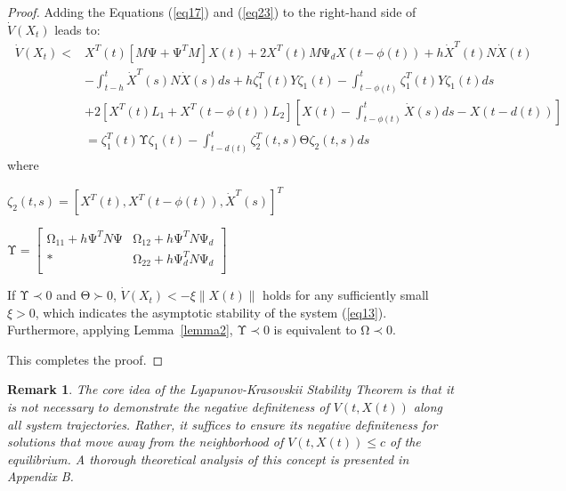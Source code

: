 \documentclass[a4paper]{cas-sc}
\newtheorem*{proof}{Proof}
\newtheorem{remark}[theorem]{Remark}
\begin{document}
\begin{proof}
Adding the Equations (\ref{eq17}) and (\ref{eq23}) to the right-hand side of $\dot{V}\left(X_t\right)$ leads to:
\begin{equation}
  \begin{aligned}
\ \dot{V}\left(X_t\right)<&X^T(t)\left[M\mathrm{\Psi}+\mathrm{\Psi}^TM\right]X(t)+2X^T(t)M\mathrm{\Psi}_dX(t-\phi(t))+h{\dot{X}}^T\left(t\right)N\dot{X}\left(t\right)\\
&-\int_{t-h}^{t}{\dot{X}}^T\left(s\right)N\dot{X}\left(s\right)ds+h\zeta_1^T(t)Y\zeta_1(t)-\int_{t-\phi(t)}^{t}\zeta_1^T(t)Y\zeta_1(t)ds\\
&+2\left[X^T(t)L_1+X^T(t-\phi(t))L_2\right]\left[X(t)-\int_{t-\phi(t)}^{t}\dot{X}(s)ds-X(t-d(t))\right]\\
&=\zeta_1^T(t)\mathrm{\Upsilon}\zeta_1(t)-\int_{t-d(t)}^{t}\zeta_2^T(t,s)\mathrm{\Theta}\zeta_2(t,s)ds 
  \end{aligned}
    \label{eq24}
\end{equation}
where 
\begin{description}
\item $\zeta_2\left(t,s\right)=\left[X^T\left(t\right),X^T\left(t-\phi\left(t\right)\right),{\dot{X}}^T(s)\right]^T$
\item $\mathrm{\Upsilon}=\left[\begin{matrix}\mathrm{\Omega}_{11}+h\mathrm{\Psi}^TN\mathrm{\Psi}&\mathrm{\Omega}_{12}+h\mathrm{\Psi}^TN\mathrm{\Psi}_d\\\ast&\mathrm{\Omega}_{22}+h\mathrm{\Psi}_d^TN\mathrm{\Psi}_d\\\end{matrix}\right]$
\end{description}

If $\mathrm{\Upsilon}\prec0$ and $\mathrm{\Theta}\succ0$, $\dot{V}\left(X_t\right)<-\xi\left\| {{{X}}(t)} \right\|$ holds for any sufficiently small $\xi>0$, which indicates the asymptotic stability of the system (\ref{eq13}). Furthermore, applying Lemma~\ref{lemma2}, $\mathrm{\Upsilon}\prec0$ is equivalent to $\mathrm{\Omega}\prec0$.

This completes the proof. 
\end{proof}

\begin{remark}
  \label{remarkdiff}
  The core idea of the Lyapunov-Krasovskii Stability Theorem is that it is not necessary to demonstrate the negative definiteness of $V\left(t,X\left(t\right)\right)$ along all system trajectories. Rather, it suffices to ensure its negative definiteness for solutions that move away from the neighborhood of $V\left(t,X\left(t\right)\right)\le c$ of the equilibrium. A thorough theoretical analysis of this concept is presented in Appendix B.
\end{remark}
\end{document}
